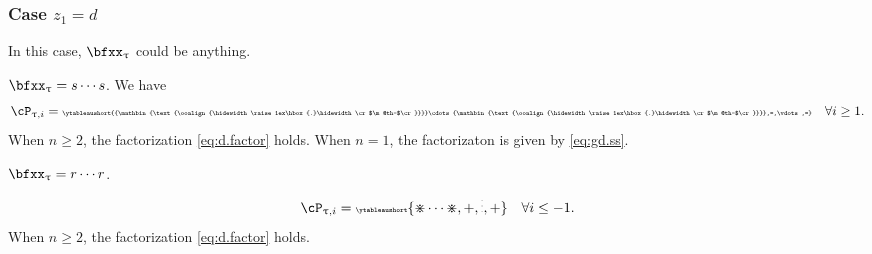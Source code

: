 \documentclass[12pt,a4paper]{amsart}
\makeatletter
\numberwithin{equation}{section}
\theoremstyle{remark}
\def\bsign{{}^b\mathrm{Sign}}
\let\ytb=\ytableaushort
\newcommand{\tytb}[1]{{\tiny\ytb{#1}}}
\newcommand{\dotminus}{\mathbin{\text{\@dotminus}}}
\newcommand{\@dotminus}{%
  \ooalign{\hidewidth\raise1ex\hbox{.}\hidewidth\cr$\m@th-$\cr}%
}
\def\pcL{\cL^+}
\def\ncL{\cL^-}
\def\pcB{\cB^+}
\def\ncB{\cB^-}
\def\uptaupp{\uptau^{\prime\prime}}
\def\uum{{\dotminus}}
\def\uup{\divideontimes}
\makeatother
\begin{document}
  \subsubsection{Case $z_{1}=d$}\label{sec:z.d}
  In this case, $\bfxx_{\uptau}$ could be anything.
  \begin{enumT}
    \item $\bfxx_{\uptau}=s\cdots s$. We have
    \[
      \cP_{\uptau,i} = \tytb{\uum\cdots\uum,=,\vdots,=} \quad \forall i\geq 1.
    \]
    When $n\geq 2$, the factorization \eqref{eq:d.factor} holds.
    When $n=1$, the factorizaton is given by \eqref{eq:gd.ss}.
    \item $\bfxx_{\uptau}=r\cdots r$.
    \[
      \cP_{\uptau,i} = \tytb{\uup\cdots\uup,+,\vdots,+} \quad \forall i\leq -1.
    \]
    When $n\geq 2$, the factorization \eqref{eq:d.factor} holds.


\end{enumT}
\end{document}
